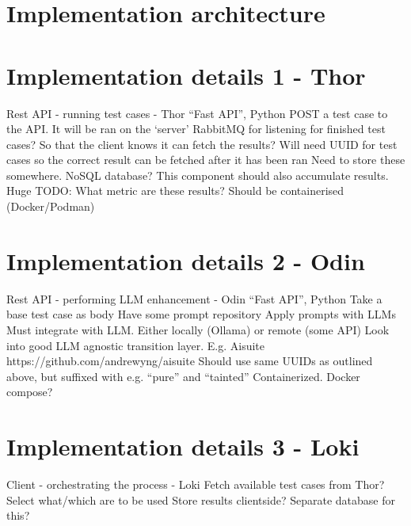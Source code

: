 
\chapter{Implementation architecture}
\chapter{Implementation details 1 - Thor}

Rest API - running test cases - Thor
“Fast API”, Python
POST a test case to the API. It will be ran on the ‘server’
RabbitMQ for listening for finished test cases? So that the client knows it can fetch the results?
Will need UUID for test cases so the correct result can be fetched after it has been ran
Need to store these somewhere. NoSQL database?
This component should also accumulate results.
Huge TODO: What metric are these results?
Should be containerised (Docker/Podman)

\chapter{Implementation details 2 - Odin}

Rest API - performing LLM enhancement - Odin
“Fast API”, Python
Take a base test case as body
Have some prompt repository
Apply prompts with LLMs
Must integrate with LLM. Either locally (Ollama) or remote (some API)
Look into good LLM agnostic transition layer. E.g. Aisuite
https://github.com/andrewyng/aisuite
Should use same UUIDs as outlined above, but suffixed with e.g. “pure” and “tainted”
Containerized. Docker compose?

\chapter{Implementation details 3 - Loki}

Client - orchestrating the process - Loki
Fetch available test cases from Thor? Select what/which are to be used
Store results clientside? Separate database for this?